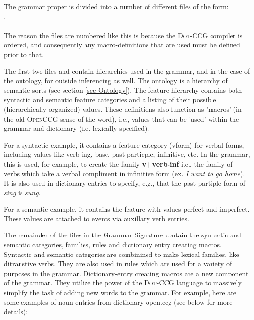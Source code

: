 The grammar proper is divided into a number of different files of the form: \\

 . \\ \\   
The reason the files are numbered like this is because the \textsc{Dot-CCG} compiler is ordered, and consequently any macro-definitions that are used must be defined prior to that. 

The first two files  and  contain hierarchies used in the grammar, and in the case of the ontology, for outside inferencing as well. The ontology is a hierarchy of semantic sorts (see section \ref{sec-Ontology}). The feature hierarchy contains both syntactic and semantic feature categories and a listing of their possible (hierarchically organized) values. These definitions also function as 'macros' (in the old \textsc{OpenCCG} sense of the word), i.e., values that  can be 'used' within the grammar and dictionary (i.e. lexically specified). 
      
For a syntactic example, it contains a feature category \textsc(vform) for verbal forms, including values like verb-ing, base, past-particple, infinitive, etc. In the grammar, this is used, for example, to create the family \textbf{v+verb-inf} i.e., the family of verbs which take a verbal compliment in infinitive form (ex. \emph{I want to go home}). It is also used in dictionary entries to specify, e.g., that the past-partiple form of \emph{sing} is \emph{sung}.
   
For a semantic example, it contains the feature  with values perfect and imperfect. These values are attached to events via auxillary verb entries. 
  
The remainder of the files in the Grammar Signature contain the syntactic and semantic categories, families, rules and  dictionary entry creating macros. Syntactic and semantic categories are combinined to make lexical families, like ditranstive verbs. They are also used in rules which are used for a variety of purposes in the grammar. Dictionary-entry creating macros are a new component of the grammar. They utilize the power of the \textsc{Dot-CCG} language to massively simplify the task of adding new words to the grammar. For example, here are some examples of noun entries from dictionary-open.ccg (see below for more details): \\

